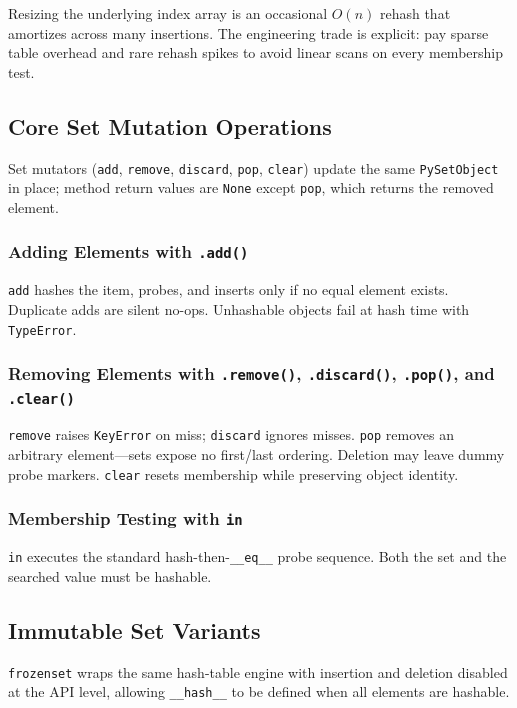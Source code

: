 \documentclass[a4paper,twoside]{report}
\begin{document}
Resizing the underlying index array is an occasional $O(n)$ rehash that amortizes across many insertions. The engineering trade is explicit: pay sparse table overhead and rare rehash spikes to avoid linear scans on every membership test.


\subsection{Core Set Mutation Operations}

Set mutators (\texttt{add}, \texttt{remove}, \texttt{discard}, \texttt{pop}, \texttt{clear}) update the same \texttt{PySetObject} in place; method return values are \texttt{None} except \texttt{pop}, which returns the removed element.

\subsubsection{Adding Elements with \texttt{.add()}}

\texttt{add} hashes the item, probes, and inserts only if no equal element exists. Duplicate adds are silent no-ops. Unhashable objects fail at hash time with \texttt{TypeError}.

\subsubsection{Removing Elements with \texttt{.remove()}, \texttt{.discard()}, \texttt{.pop()}, and \texttt{.clear()}}

\texttt{remove} raises \texttt{KeyError} on miss; \texttt{discard} ignores misses. \texttt{pop} removes an arbitrary element---sets expose no first/last ordering. Deletion may leave dummy probe markers. \texttt{clear} resets membership while preserving object identity.

\subsubsection{Membership Testing with \texttt{in}}

\texttt{in} executes the standard hash-then-\texttt{\_\_eq\_\_} probe sequence. Both the set and the searched value must be hashable.


\subsection{Immutable Set Variants}

\texttt{frozenset} wraps the same hash-table engine with insertion and deletion disabled at the API level, allowing \texttt{\_\_hash\_\_} to be defined when all elements are hashable.
\end{document}
